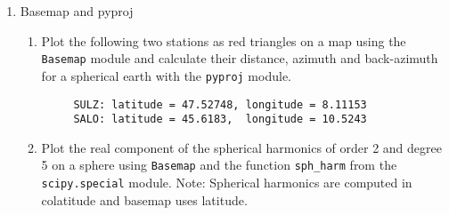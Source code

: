 \documentclass{article}
\begin{document}
\begin{enumerate}
    \item Basemap and pyproj
    \begin{enumerate}
      \item Plot the following two stations as red triangles on a map using the
      \verb#Basemap# module and calculate their distance, azimuth and
      back-azimuth for a spherical earth with the \verb#pyproj# module.\\
	 \begin{verbatim}
	 SULZ: latitude = 47.52748, longitude = 8.11153
	 SALO: latitude = 45.6183,  longitude = 10.5243
	 \end{verbatim}
	 \item Plot the real component of the spherical harmonics of order 
	 2 and degree 5 on a sphere using \verb#Basemap# and the function
	 \verb#sph_harm# from the \verb#scipy.special# module. Note: Spherical
	 harmonics are computed in colatitude and basemap uses latitude. 
      \end{enumerate}
\end{enumerate}
\end{document}
